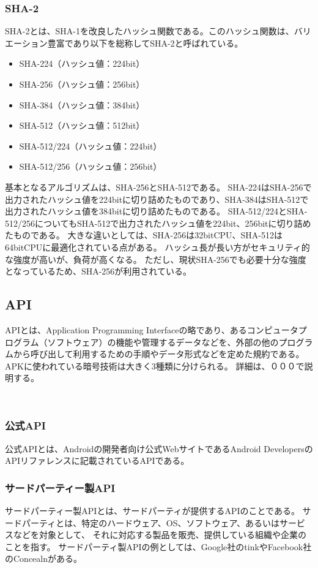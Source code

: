 \subsubsection{SHA-2}
SHA-2とは、SHA-1を改良したハッシュ関数である。このハッシュ関数は、バリエーション豊富であり以下を総称してSHA-2と呼ばれている。
\begin{itemize}
\item SHA-224（ハッシュ値：224bit）
\item SHA-256（ハッシュ値：256bit）
\item SHA-384（ハッシュ値：384bit）
\item SHA-512（ハッシュ値：512bit）
\item SHA-512/224（ハッシュ値：224bit）
\item SHA-512/256（ハッシュ値：256bit）
\end{itemize}
基本となるアルゴリズムは、SHA-256とSHA-512である。
SHA-224はSHA-256で出力されたハッシュ値を224bitに切り詰めたものであり、SHA-384はSHA-512で出力されたハッシュ値を384bitに切り詰めたものである。
SHA-512/224とSHA-512/256についてもSHA-512で出力されたハッシュ値を224bit、256bitに切り詰めたものである。
大きな違いとしては、SHA-256は32bitCPU、SHA-512は64bitCPUに最適化されている点がある。
ハッシュ長が長い方がセキュリティ的な強度が高いが、負荷が高くなる。
ただし、現状SHA-256でも必要十分な強度となっているため、SHA-256が利用されている。


\subsection{API}
APIとは、Application Programming Interfaceの略であり、あるコンピュータプログラム（ソフトウェア）の機能や管理するデータなどを、外部の他のプログラムから呼び出して利用するための手順やデータ形式などを定めた規約である。
APKに使われている暗号技術は大きく3種類に分けられる。
詳細は、０００で説明する。


\subsubsection {公式API}
公式APIとは、Androidの開発者向け公式WebサイトであるAndroid DevelopersのAPIリファレンスに記載されているAPIである。

\subsubsection {サードパーティー製API}
サードパーティー製APIとは、サードパーティが提供するAPIのことである。
サードパーティとは、特定のハードウェア、OS、ソフトウェア、あるいはサービスなどを対象として、
それに対応する製品を販売、提供している組織や企業のことを指す。
サードパーティ製APIの例としては、Google社のtinkやFacebook社のConcealnがある。

